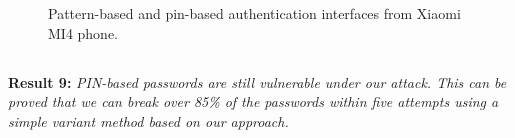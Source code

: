         \begin{figure}[!t]
            \centering
            \hspace{0.5cm}
            \caption{Pattern-based and pin-based authentication interfaces from Xiaomi MI4 phone.}
            \label{fig:unlock interface}
        \end{figure}

    \subsection{}
        \noindent \textbf{Result 9:} \emph{PIN-based passwords are still vulnerable under our attack. This can be proved that we can break over 85\% of the passwords within five attempts using a simple variant method based on our approach.}

